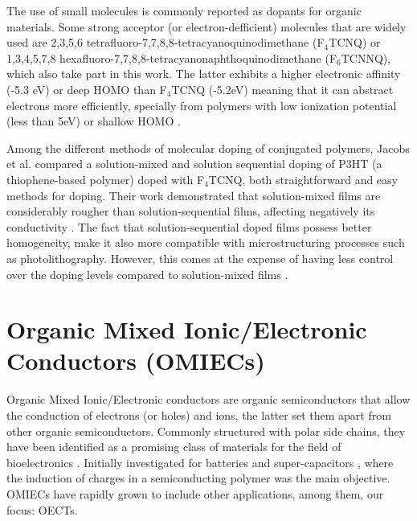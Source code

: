 The use of small molecules is commonly reported as dopants for organic materials. Some strong acceptor (or electron-defficient) molecules that are widely used are 2,3,5,6 tetrafluoro-7,7,8,8-tetracyanoquinodimethane (F$_{4}$TCNQ) or 1,3,4,5,7,8 hexafluoro-7,7,8,8-tetracyanonaphthoquinodimethane (F$_{6}$TCNNQ), which also take part in this work. The latter exhibits a higher electronic affinity (-5.3 eV) or deep HOMO than F$_{4}$TCNQ (-5.2eV) meaning that it can abstract electrons more efficiently, specially from polymers with low ionization potential (less than 5eV) or shallow HOMO \cite{kieferDoubleDopingConjugated2019}%
.

Among the different methods of molecular doping of conjugated polymers, Jacobs et al. compared a solution-mixed and solution sequential doping of P3HT (a thiophene-based polymer) doped with F$_{4}$TCNQ, both straightforward and easy methods for doping. Their work demonstrated that solution-mixed films are considerably rougher than solution-sequential films, affecting negatively its conductivity \cite{jacobsComparisonSolutionmixedSequentially2016}. The fact that solution-sequential doped films possess better homogeneity, make it also more compatible with microstructuring processes such as photolithography. However, this comes at the expense of having less control over the doping levels compared to solution-mixed films \cite{tanOrganicMixedIonic2022}.

\section{Organic Mixed Ionic/Electronic Conductors (OMIECs)} \label{sec:omiecs}

Organic Mixed Ionic/Electronic conductors are organic semiconductors that allow the conduction of electrons (or holes) and ions, the latter set them apart from other organic semiconductors. %
Commonly structured with polar side chains, they have been identified as a promising class of materials for the field of bioelectronics
\cite{giovannittiEnergeticControlRedoxActive2020}. Initially investigated for batteries and super-capacitors \cite{snookConductingpolymerbasedSupercapacitorDevices2011}
\cite{liangOrganicElectrodeMaterials2012}, where the induction of charges in a semiconducting polymer was the main objective. OMIECs have rapidly grown to include other applications, among them, our focus: OECTs.

